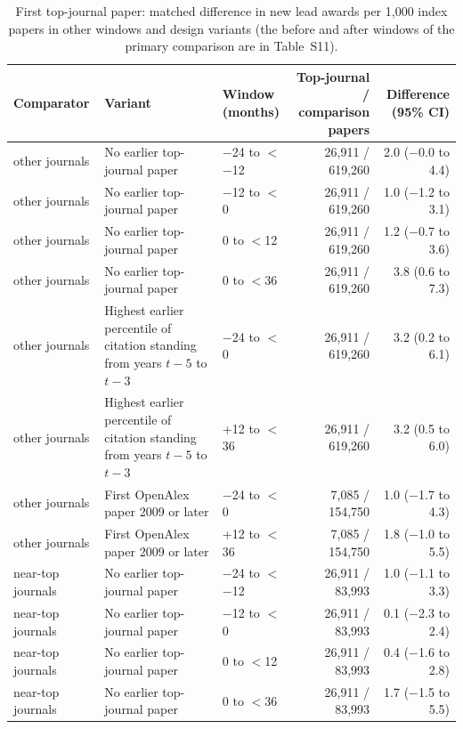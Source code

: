 \begin{table}[H]
\centering\small
\caption{First top-journal paper: matched difference in new lead awards per 1,000 index papers in other windows and design variants (the before and after windows of the primary comparison are in Table~S11).}\label{tab:s_first_checks}
\footnotesize
\begin{tabularx}{\linewidth}{l>{\raggedright\arraybackslash}Xlrr}
\toprule
Comparator & Variant & \makecell[lb]{Window\\(months)} & \makecell[rb]{Top-journal /\\comparison\\papers} & \makecell[rb]{Difference\\(95\% CI)} \\
\midrule
other journals & No earlier top-journal paper & $-$24 to $<$$-$12 & 26,911 / 619,260 & 2.0 ($-$0.0 to 4.4) \\
other journals & No earlier top-journal paper & $-$12 to $<$0 & 26,911 / 619,260 & 1.0 ($-$1.2 to 3.1) \\
other journals & No earlier top-journal paper & 0 to $<$12 & 26,911 / 619,260 & 1.2 ($-$0.7 to 3.6) \\
other journals & No earlier top-journal paper & 0 to $<$36 & 26,911 / 619,260 & 3.8 (0.6 to 7.3) \\
other journals & Highest earlier percentile of citation standing from years $t-5$ to $t-3$ & $-$24 to $<$0 & 26,911 / 619,260 & 3.2 (0.2 to 6.1) \\
other journals & Highest earlier percentile of citation standing from years $t-5$ to $t-3$ & +12 to $<$36 & 26,911 / 619,260 & 3.2 (0.5 to 6.0) \\
other journals & First OpenAlex paper 2009 or later & $-$24 to $<$0 & 7,085 / 154,750 & 1.0 ($-$1.7 to 4.3) \\
other journals & First OpenAlex paper 2009 or later & +12 to $<$36 & 7,085 / 154,750 & 1.8 ($-$1.0 to 5.5) \\
near-top journals & No earlier top-journal paper & $-$24 to $<$$-$12 & 26,911 / 83,993 & 1.0 ($-$1.1 to 3.3) \\
near-top journals & No earlier top-journal paper & $-$12 to $<$0 & 26,911 / 83,993 & 0.1 ($-$2.3 to 2.4) \\
near-top journals & No earlier top-journal paper & 0 to $<$12 & 26,911 / 83,993 & 0.4 ($-$1.6 to 2.8) \\
near-top journals & No earlier top-journal paper & 0 to $<$36 & 26,911 / 83,993 & 1.7 ($-$1.5 to 5.5) \\

\end{tabularx}
\end{table}
